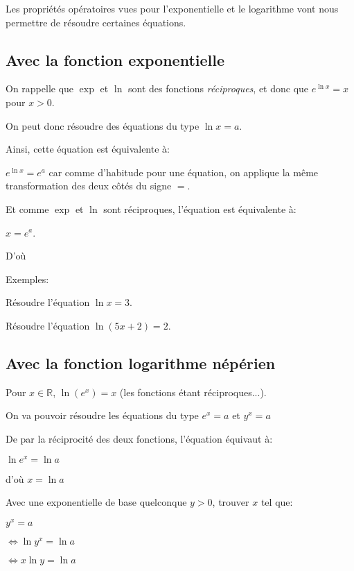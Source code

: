 \documentclass[a4paper,12pt]{scrartcl}
\begin{document}
Les propriétés opératoires vues pour l'exponentielle et le logarithme vont nous permettre de résoudre certaines équations.

\subsection{Avec la fonction exponentielle}

On rappelle que $\exp$ et $\ln$ sont des fonctions \emph{réciproques}, et donc que $e^{\ln x} = x$ pour $x>0$.

On peut donc résoudre des équations du type $\ln x = a$.

Ainsi, cette équation est équivalente à:

$e^{\ln x} = e^{a}$ car comme d'habitude pour une équation, on applique la même transformation des deux côtés du signe $=$.

Et comme $\exp$ et $\ln$ sont réciproques, l'équation est équivalente à:

$x = e^{a}$.

D'où 




Exemples:

Résoudre l'équation $\ln x = 3$.


Résoudre l'équation $\ln(5x+2) = 2$.


\subsection{Avec la fonction logarithme népérien}

Pour $x \in \mathbb{R}$, $\ln(e^x) = x$ (les fonctions étant réciproques...).

On va pouvoir résoudre les équations du type $e^x = a$ et $y^x = a$

De par la réciprocité des deux fonctions, l'équation équivaut à:

$\ln e^x = \ln a$

d'où $x = \ln a$


Avec une exponentielle de base quelconque $y>0$, trouver $x$ tel que:

$y^x = a$

$\Leftrightarrow \ln{y^x} = \ln{a}$

$\Leftrightarrow x \ln{y} = \ln{a}$
\end{document}
